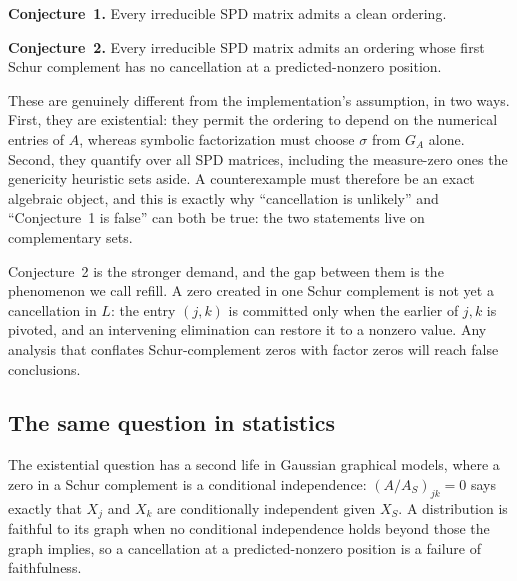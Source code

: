 \documentclass[11pt]{article}
\theoremstyle{plain}
\theoremstyle{definition}
\begin{document}
\begin{humanblock}
\noindent \textbf{Conjecture~1.} Every irreducible SPD matrix admits a clean ordering.
\newline

\noindent \textbf{Conjecture~2.} Every irreducible SPD matrix admits an ordering whose first Schur complement has no cancellation at a predicted-nonzero position.
\newline

These are genuinely different from the implementation's assumption, in two ways. First, they are existential: they permit the ordering to depend on the numerical entries of $A$, whereas symbolic factorization must choose $\sigma$ from $G_A$ alone. Second, they quantify over all SPD matrices, including the measure-zero ones the genericity heuristic sets aside. A counterexample must therefore be an exact algebraic object, and this is exactly why ``cancellation is unlikely'' and ``Conjecture~1 is false'' can both be true: the two statements live on complementary sets.

Conjecture~2 is the stronger demand, and the gap between them is the phenomenon we call refill. A zero created in one Schur complement is not yet a cancellation in $L$: the entry $(j,k)$ is committed only when the earlier of $j,k$ is pivoted, and an intervening elimination can restore it to a nonzero value. Any analysis that conflates Schur-complement zeros with factor zeros will reach false conclusions.%

\subsection{The same question in statistics}\label{sec:stats}

The existential question has a second life in Gaussian graphical models, where a zero in a Schur complement is a conditional independence: $(A/A_S)_{jk} = 0$ says exactly that $X_j$ and $X_k$ are conditionally independent given $X_S$. A distribution is faithful to its graph when no conditional independence holds beyond those the graph implies, so a cancellation at a predicted-nonzero position is a failure of faithfulness.


\end{humanblock}
\end{document}
